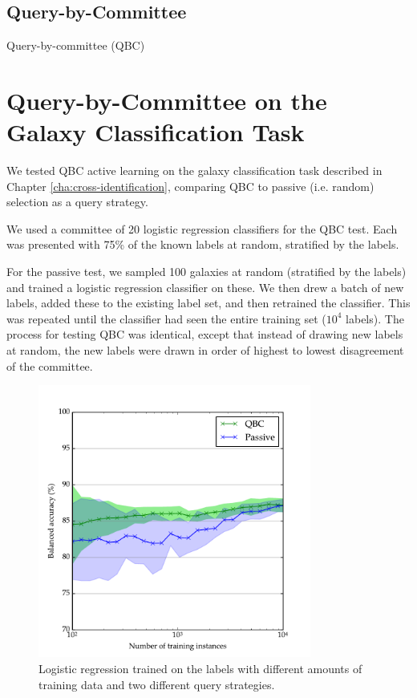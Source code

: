 

    \subsection{Query-by-Committee}
    \label{sec:qbc}

        Query-by-committee (QBC)

\section{Query-by-Committee on the Galaxy Classification Task}
\label{sec:rgz-qbc}

    We tested QBC active learning on the galaxy classification task described in Chapter \ref{cha:cross-identification}, comparing QBC to passive (i.e. random) selection as a query strategy.

    We used a committee of 20 logistic regression classifiers for the QBC test.
    Each was presented with 75\% of the known labels at random, stratified by the labels.

    For the passive test, we sampled 100 galaxies at random (stratified by the
    labels) and trained a logistic regression classifier on these. We then drew
    a batch of new labels, added these to the existing label set, and then
    retrained the classifier. This was repeated until the classifier had seen
    the entire training set ($10^4$ labels). The process for testing QBC was
    identical, except that instead of drawing new labels at random, the new
    labels were drawn in order of highest to lowest disagreement of the
    committee.

    \begin{figure}
        \centering
        \includegraphics[width=0.8\textwidth]
            {images/experiments/rgz_qbc.pdf}
        \caption{Logistic regression trained on the \citeauthor{norris06}
            labels with different amounts of training data and two different
            query strategies.}
        \label{fig:rgz-qbc}
    \end{figure}
